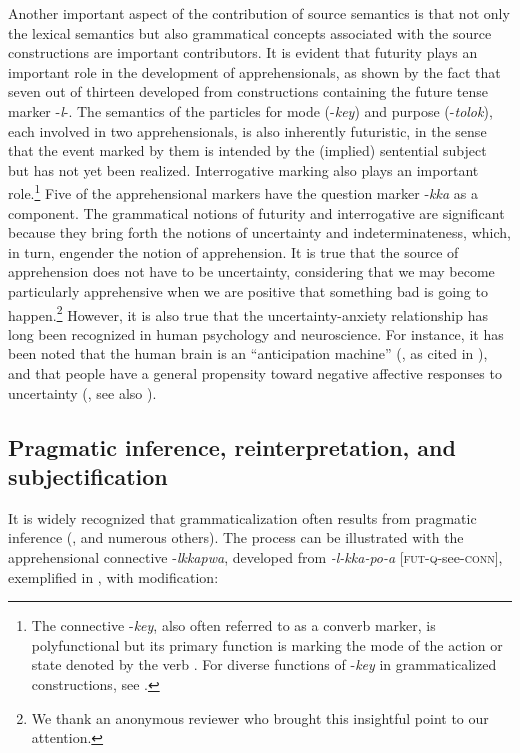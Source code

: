 \documentclass[output=paper,colorlinks,citecolor=brown]{langscibook}
\begin{document}
Another important aspect of the contribution of source semantics is that not only the lexical semantics but also grammatical concepts associated with the source constructions are important contributors. It is evident that futurity plays an important role in the development of apprehensionals, as shown by the fact that seven out of thirteen developed from constructions containing the future tense marker \nobreakdash-\textit{l}-. The semantics of the particles for mode (-\textit{key}) and purpose (\nobreakdash-\textit{tolok}), each involved in two apprehensionals, is also inherently futuristic, in the sense that the event marked by them is intended by the (implied) sentential subject but has not yet been realized. Interrogative marking also plays an important role.\footnote{The connective \nobreakdash-\textit{key}, also often referred to as a converb marker, is polyfunctional but its primary function is marking the mode of the action or state denoted by the verb \citep{Rhee1996}. For diverse functions of  \nobreakdash-\textit{key} in grammaticalized constructions, see \citet{Kim2011}.} Five of the apprehensional markers have the question marker \nobreakdash-\textit{kka} as a component. The grammatical notions of futurity and interrogative are significant because they bring forth the notions of uncertainty and indeterminateness, which, in turn, engender the notion of apprehension. It is true that the source of apprehension does not have to be uncertainty, considering that we may become particularly apprehensive when we are positive that something bad is going to happen.\footnote{We thank an anonymous reviewer who brought this insightful point to our attention.} However, it is also true that the uncertainty-anxiety relationship has long been recognized in human psychology and neuroscience. For instance, it has been noted that the human brain is an ``anticipation machine'' (\citealt{Gilbert2006}, as cited in \citealt[488]{GrupeNitschke2013}), and that people have a general propensity toward negative affective responses to uncertainty (\citealt{AndersonEtAl2019}, see also \citealt{Carleton2016b, Carleton2016a,}). 


\subsection{Pragmatic inference, reinterpretation, and subjectification}
\label{subsec:pragmatic}

It is widely recognized that grammaticalization often results from pragmatic inference (\citealt{Traugott1989,HopperTraugott2003,Slobin1994,bybeeetal1994,Fischer2008}, and numerous others). The process can be illustrated with the apprehensional connective \nobreakdash-\textit{lkkapwa}, developed from \textit{-l-kka-po-a} [\textsc{fut-q}-see-\textsc{conn}], exemplified in , with modification:
\end{document}
